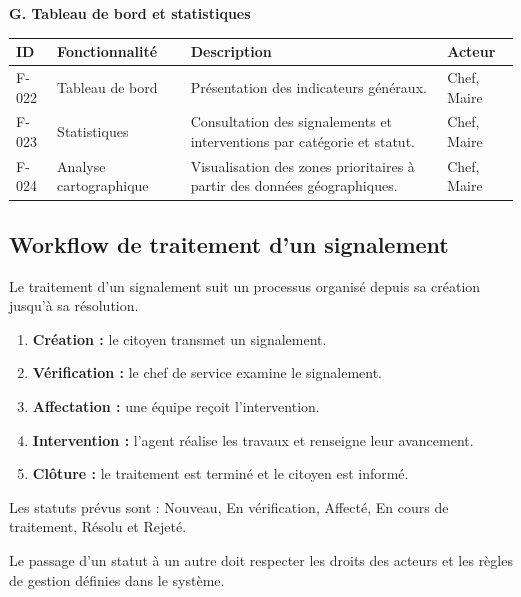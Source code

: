 \documentclass[11pt,a4paper,oneside]{report}
\begin{document}
	\noindent\textbf{G. Tableau de bord et statistiques}
	
	\begin{center}
		\begin{tabular}{|p{1.1cm}|p{3cm}|p{8cm}|p{1.7cm}|}
			\hline
			\textbf{ID} & \textbf{Fonctionnalité} &
			\textbf{Description} & \textbf{Acteur} \\ \hline
			F-022 & Tableau de bord & Présentation des indicateurs généraux. & Chef, Maire \\ \hline
			F-023 & Statistiques & Consultation des signalements et interventions par catégorie et statut. & Chef, Maire \\ \hline
			F-024 & Analyse cartographique & Visualisation des zones prioritaires à partir des données géographiques. & Chef, Maire \\ \hline
		\end{tabular}
	\end{center}
	
	\normalsize
	
	\subsection{Workflow de traitement d'un signalement}
	
	Le traitement d'un signalement suit un processus
	organisé depuis sa création jusqu'à sa résolution.
	
	\begin{enumerate}
		\item \textbf{Création :} le citoyen transmet
		un signalement.
		
		\item \textbf{Vérification :} le chef de service
		examine le signalement.
		
		\item \textbf{Affectation :} une équipe reçoit
		l'intervention.
		
		\item \textbf{Intervention :} l'agent réalise
		les travaux et renseigne leur avancement.
		
		\item \textbf{Clôture :} le traitement est terminé
		et le citoyen est informé.
	\end{enumerate}
	
	Les statuts prévus sont : Nouveau, En vérification,
	Affecté, En cours de traitement, Résolu et Rejeté.
	
	Le passage d'un statut à un autre doit respecter
	les droits des acteurs et les règles de gestion
	définies dans le système.
	
\end{document}
